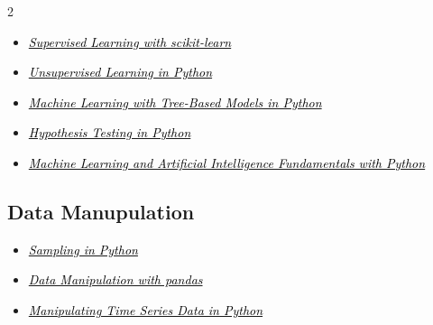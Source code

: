 \documentclass[
	10pt, %
]{RESUME}
\begin{document}
\begin{paracol}{2}
\begin{itemize}
		\item[\faCertificate] \href{https://www.datacamp.com/statement-of-accomplishment/course/89efb9c64a2ba11dbe758718478b1e6584482f53?raw=1}
		      {\textcolor{black}{\textit{Supervised Learning with scikit-learn}}}

		\item[\faCertificate] \href{https://www.datacamp.com/statement-of-accomplishment/course/5a11a956cbbf72f58df34ebb4bcb8953d50827da?raw=1}
		      {\textcolor{black}{\textit{Unsupervised Learning in Python}}}

		\item[\faCertificate] \href{https://www.datacamp.com/statement-of-accomplishment/course/4ecb52a63fbb1b3a1ca42c34374826979cd1cb48?raw=1}
		      {\textcolor{black}{\textit{Machine Learning with Tree-Based Models in Python}}}

		\item[\faCertificate] \href{https://www.datacamp.com/statement-of-accomplishment/course/66403a5d2f4b1113615c4332ff47006d7d6b273d?raw=1}
		      {\textcolor{black}{\textit{Hypothesis Testing in Python}}}

		\item[\faCertificate] \href{https://mega.nz/file/olQSCLgR\#MNku1sr157kYUQNx9KW2Ajq9rqzuz5S4D2XCS38LaSc}
		      {\textcolor{black}{\textit{Machine Learning and Artificial Intelligence Fundamentals with Python}}}

	\end{itemize}

	\subsection{\textbf{Data Manupulation}}
	\begin{itemize}

		\item[\faCertificate] \href{https://www.datacamp.com/statement-of-accomplishment/course/fbc94a874eb1ade1ed86b66c19fd32b3c5077f2a?raw=1}
		      {\textcolor{black}{\textit{Sampling in Python}}}

		\item[\faCertificate] \href{https://www.datacamp.com/statement-of-accomplishment/course/62a92ec8ef730881263a99b128064cc771ca7519?raw=1}
		      {\textcolor{black}{\textit{Data Manipulation with pandas}}}

		\item[\faCertificate] \href{https://www.datacamp.com/statement-of-accomplishment/course/55a0802fb62bd726dbdb6906505f54d98f8f1c6c?raw=1}
		      {\textcolor{black}{\textit{Manipulating Time Series Data in Python}}}
	\end{itemize}

\end{paracol}
\end{document}
